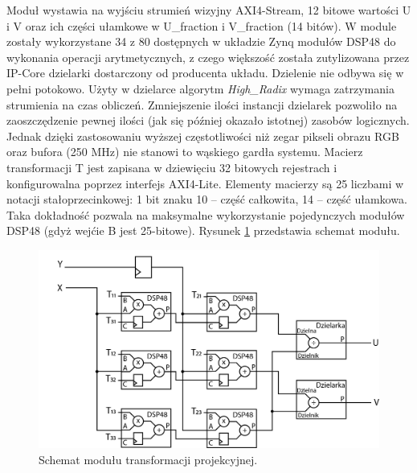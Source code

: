 Moduł wystawia na wyjściu strumień wizyjny AXI4-Stream, 12 bitowe wartości U i V oraz ich części ułamkowe w U\_fraction i V\_fraction (14 bitów). %
W module zostały wykorzystane 34 z 80 dostępnych w układzie Zynq modułów DSP48 do wykonania operacji arytmetycznych, z czego większość została zutylizowana przez IP-Core dzielarki dostarczony od producenta układu. %
Dzielenie nie odbywa się w pełni potokowo. Użyty w dzielarce algorytm \textit{High\_Radix} wymaga zatrzymania strumienia na czas obliczeń. Zmniejszenie ilości instancji dzielarek pozwoliło na zaoszczędzenie pewnej ilości (jak się później okazało istotnej) zasobów logicznych.
Jednak dzięki zastosowaniu wyższej częstotliwości niż zegar pikseli obrazu RGB oraz bufora (250 MHz) nie stanowi to wąskiego gardła systemu. %
Macierz transformacji T jest zapisana w dziewięciu 32 bitowych rejestrach i konfigurowalna poprzez interfejs AXI4-Lite. 
Elementy macierzy są 25 liczbami w notacji stałoprzecinkowej: 1 bit znaku 10 – część całkowita, 14 – część ułamkowa. Taka dokładność pozwala na maksymalne wykorzystanie pojedynczych modułów DSP48 (gdyż wejćie B jest 25-bitowe). Rysunek \ref{fig:transfProjek} przedstawia schemat modułu.
\begin{figure}
\centering
\includegraphics[width=0.70\linewidth]{images/transfProjek.png}
\caption[Schemat modułu transformacji projekcyjnej.]{Schemat modułu transformacji projekcyjnej.}
\label{fig:transfProjek}
\end{figure}
